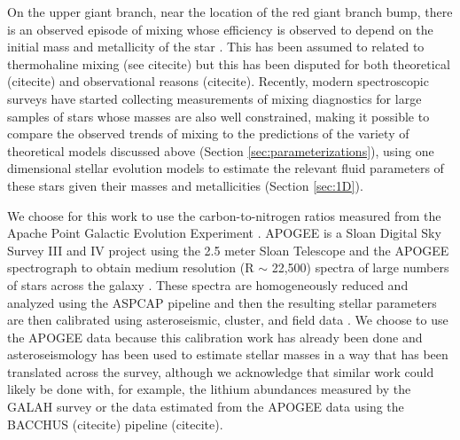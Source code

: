 On the upper giant branch, near the location of the red giant branch bump, there is an observed episode of mixing whose efficiency is observed to depend on the initial mass and metallicity of the star \citep[e.g.][]{Gratton2000}. This has been assumed to related to thermohaline mixing (see citecite) but this has been disputed for both theoretical (citecite) and observational reasons \citep{TayarJoyce2022} (citecite). Recently, modern spectroscopic surveys have started collecting measurements of mixing diagnostics for large samples of stars whose masses are also well constrained, making it possible to compare the observed trends of mixing to the predictions of the variety of theoretical models discussed above (Section \ref{sec:parameterizations}), using one dimensional stellar evolution models to estimate the relevant fluid parameters of these stars given their masses and metallicities (Section \ref{sec:1D}). 



We choose for this work to use the carbon-to-nitrogen ratios measured from the Apache Point Galactic Evolution Experiment \citep[APOGEE, ][]{Majewski2015,Majewski2017}. APOGEE is a Sloan Digital Sky Survey III and IV \citep{Blanton2017} project using the 2.5 meter Sloan Telescope \citep{Gunn2006} and the APOGEE spectrograph \citep{Wilson2019} to obtain medium resolution (R $\sim$ 22,500) spectra of large numbers of stars across the galaxy \citep{Zasowski2017, Beaton2021,?}. These spectra are homogeneously reduced and analyzed using the ASPCAP pipeline \citep{Nidever2015, Zamora2015, GarciaPerez2016} and then the resulting stellar parameters are then calibrated using asteroseismic, cluster, and field data \citep{Holtzman2015,Holtzman2018, Jonsson2020}. We choose to use the APOGEE data because this calibration work has already been done and asteroseismology has been used to estimate stellar masses in a way that has been translated across the survey, although we acknowledge that similar work could likely be done with, for example, the lithium abundances measured by the GALAH survey \citep{buder2019} or the \ctwelvecthirteen data estimated from the APOGEE data using the BACCHUS (citecite) pipeline (citecite). 

